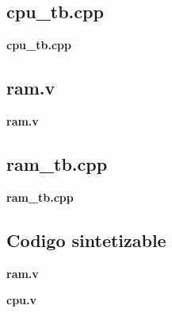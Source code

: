 \documentclass[11pt,letterpaper]{article} %
\begin{document}
\subsection{cpu\_tb.cpp}
\textbf{cpu\_tb.cpp}


\subsection{ram.v}
\textbf{ram.v}


\subsection{ram\_tb.cpp}
\textbf{ram\_tb.cpp}


\subsection{Codigo sintetizable}
\textbf{ram.v}

\textbf{cpu.v}

\end{document}
